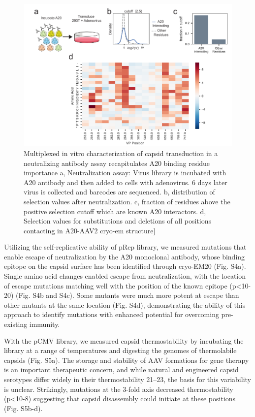 \begin{figure}
\includegraphics[width=\textwidth]{figures/20190405_x01_A20_only_revisions.pdf}
\caption[Multiplexed in vitro characterization of capsid transduction in a neutralizing antibody assay recapitulates A20 binding residue importance]{Multiplexed in vitro characterization of capsid transduction in a neutralizing antibody assay recapitulates A20 binding residue importance 
a, Neutralization assay: Virus library is incubated with A20 antibody and then added to cells with adenovirus. 6 days later virus is collected and barcodes are sequenced. b, distribution of selection values after neutralization. c, fraction of residues above the positive selection cutoff which are known A20 interactors. d, Selection values for substitutions and deletions of all positions contacting in A20-AAV2 cryo-em structure]
\label{fig:Figure 2}}
\end{figure}

Utilizing the self-replicative ability of pRep library, we measured mutations that enable escape of neutralization by the A20 monoclonal antibody, whose binding epitope on the capsid surface has been identified through cryo-EM20 (Fig. S4a). Single amino acid changes enabled escape from neutralization, with the location of escape mutations matching well with the position of the known epitope (p<10-20) (Fig. S4b and S4c). Some mutants were much more potent at escape than other mutants at the same location (Fig. S4d), demonstrating the ability of this approach to identify mutations with enhanced potential for overcoming pre-existing immunity.  

With the pCMV library, we measured capsid thermostability by incubating the library at a range of temperatures and digesting the genomes of thermolabile capsids (Fig. S5a). The storage and stability of AAV formations for gene therapy is an important therapeutic concern, and while natural and engineered capsid serotypes differ widely in their thermostability 21–23, the basis for this variability is unclear. Strikingly, mutations at the 3-fold axis decreased thermostability (p<10-8) suggesting that capsid disassembly could initiate at these positions (Fig. S5b-d).

